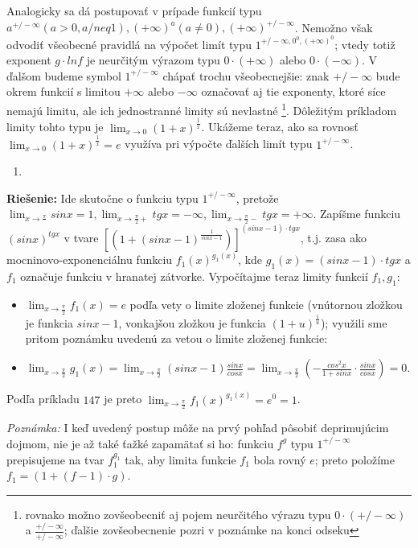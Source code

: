 Analogicky sa dá postupovať v prípade funkcií typu $a^{+/- \infty}(a>0,a /neq 1),(+\infty)^a(a \neq 0),(+\infty)^{+/- \infty}$. Nemožno však odvodiť všeobecné pravidlá na výpočet limít typu $1^{+/- \infty,0^0,(+\infty)^0}$; vtedy totiž exponent $g \cdot ln f$ je neurčitým výrazom typu $0 \cdot (+\infty)$ alebo $0 \cdot (-\infty)$.
V ďalšom budeme symbol $1^{+/- \infty}$ chápať trochu všeobecnejšie: znak $+/- \infty$ bude okrem funkcií s limitou $+\infty$ alebo $-\infty$ označovať aj tie exponenty, ktoré síce nemajú limitu, ale ich jednostranné limity sú nevlastné \footnote{rovnako možno zovšeobecniť aj pojem neurčitého výrazu typu $0 \cdot (+/- \infty)$ a $\frac{+/- \infty}{+/- \infty}$; ďalšie zovšeobecnenie pozri v poznámke na konci odseku}. Dôležitým príkladom limity tohto typu je $\lim_{x \rightarrow 0} (1+x)^{\frac{1}{x}}$. Ukážeme teraz, ako sa rovnosť $\lim_{x \rightarrow 0} (1+x)^{\frac{1}{x}}=e$ využíva pri výpočte ďalších limít typu $1^{+/- \infty}$.

\begin{enumerate}[resume]
  \item {}
\end{enumerate}

\textbf{Riešenie:}
Ide skutočne o funkciu typu $1^{+/- \infty}$, pretože $\lim_{x \rightarrow \frac{\pi}{}} sin x=1,\lim_{x \rightarrow \frac{\pi}{2}+} tg x=-\infty,\lim_{x \rightarrow \frac{\pi}{2}-} tg x=+\infty$. Zapíšme funkciu $(sin x)^{tg x}$ v tvare $[(1+(sin x-1)^{\frac{1}{sin x-1}})]^{(sin x-1)\cdot tg x}$, t.j. zasa ako mocninovo-exponenciálnu funkciu $f_1(x)^{g_1(x)}$, kde $g_1(x)=(sin x-1)\cdot tg x$ a $f_1$ označuje funkciu v hranatej zátvorke. Vypočítajme teraz limity funkcií $f_1, g_1$:
\begin{itemize}
\item $\lim_{x \rightarrow \frac{\pi}{2}} f_1(x)=e$ podľa vety o limite zloženej funkcie (vnútornou zložkou je funkcia $sin x-1$, vonkajšou zložkou je funkcia $(1+u)^{\frac{1}{u}}$); využili sme pritom poznámku uvedenú za vetou o limite zloženej funkcie:
\item $\lim_{x \rightarrow \frac{\pi}{2}}g_1(x)=\lim_{x \rightarrow \frac{\pi}{2}} (sin x-1)\frac{sin x}{cos x}=\lim_{x \rightarrow \frac{\pi}{2}} (-\frac{cos ^2 x}{1+sin x}\cdot \frac{sin x}{cos x})=0$.
\end{itemize}
Podľa príkladu $147$ je preto $\lim_{x \rightarrow \frac{\pi}{2}} f_1(x)^{g_1(x)}=e^0=1$.

\textit{Poznámka:}
I keď uvedený postup môže na prvý pohľad pôsobiť deprimujúcim dojmom, nie je až také ťažké zapamätať si ho: funkciu $f^g$ typu $1^{+/- \infty}$ prepisujeme na tvar $f_1^{g_1}$ tak, aby limita funkcie $f_1$ bola rovný $e$; preto položíme $f_1=(1+(f-1)\cdot g)$.

